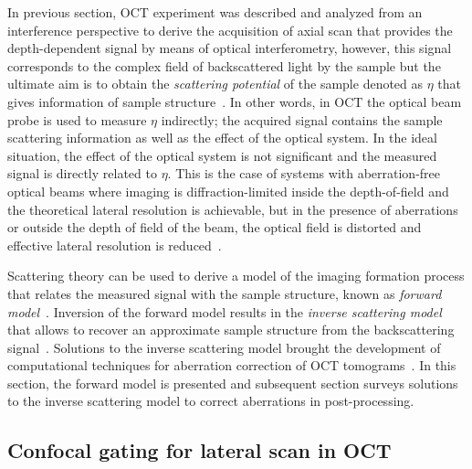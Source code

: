 In previous section, OCT experiment was described and analyzed from an interference perspective to derive the acquisition of axial scan that provides the depth-dependent signal by means of optical interferometry, however, this signal corresponds to the complex field of backscattered light by the sample but the ultimate aim is to obtain the \textit{scattering potential} of the sample denoted as $\eta$ that gives information of sample structure~\cite{Ralston2006_Inverse}. In other words, in OCT the optical beam probe is used to measure $\eta$ indirectly; the acquired signal contains the sample scattering information as well as the effect of the optical system. In the ideal situation, the effect of the optical system is not significant and the measured signal is directly related to $\eta$. This is the case of systems with aberration-free optical beams where imaging is diffraction-limited inside the depth-of-field and the theoretical lateral resolution is achievable, but in the presence of aberrations or outside the depth of field of the beam, the optical field is distorted and effective lateral resolution is reduced~\cite{Ralston2006_Inverse}.

Scattering theory can be used to derive a model of the imaging formation process that relates the measured signal with the sample structure, known as \textit{forward model}~\cite{Ralston2006_Inverse, Ralston2006_NonParaxial}. Inversion of the forward model results in the \textit{inverse scattering model} that allows to recover an approximate sample structure from the backscattering signal~\cite{Ralston2006_Interferometric}. Solutions to the inverse scattering model brought the development of computational techniques for aberration correction of OCT tomograms~\cite{Ralston2006_Interferometric, Yasuno2006_Noniterative, Adie2012_Computational}. In this section, the forward model is presented and subsequent section surveys solutions to the inverse scattering model to correct aberrations in post-processing.

\subsection{Confocal gating for lateral scan in OCT}

